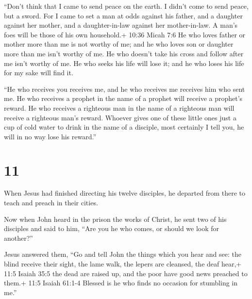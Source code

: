  ``Don't think that I came to send peace on the earth. I
didn't come to send peace, but a sword.  For I came to set
a man at odds against his father, and a daughter against her mother, and
a daughter-in-law against her mother-in-law.  A man's foes
will be those of his own household.+ 10:36 Micah 7:6  He
who loves father or mother more than me is not worthy of me; and he who
loves son or daughter more than me isn't worthy of me.  He
who doesn't take his cross and follow after me isn't worthy of me.
 He who seeks his life will lose it; and he who loses his
life for my sake will find it.

 ``He who receives you receives me, and he who receives me
receives him who sent me.  He who receives a prophet in the
name of a prophet will receive a prophet's reward. He who receives a
righteous man in the name of a righteous man will receive a righteous
man's reward.  Whoever gives one of these little ones just
a cup of cold water to drink in the name of a disciple, most certainly I
tell you, he will in no way lose his reward.''

\hypertarget{section-10}{%
\section{11}\label{section-10}}

 When Jesus had finished directing his twelve disciples, he
departed from there to teach and preach in their cities.

 Now when John heard in the prison the works of Christ, he
sent two of his disciples  and said to him, ``Are you he who
comes, or should we look for another?''

 Jesus answered them, ``Go and tell John the things which
you hear and see:  the blind receive their sight, the lame
walk, the lepers are cleansed, the deaf hear,+ 11:5 Isaiah 35:5 the dead
are raised up, and the poor have good news preached to them.+ 11:5
Isaiah 61:1-4  Blessed is he who finds no occasion for
stumbling in me.''


